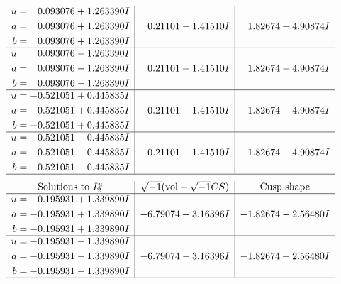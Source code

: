 \documentclass[1p]{elsarticle_modified}
\theoremstyle{definition}
\newcommand{\I}{\sqrt{-1}}
\begin{document}
$$\begin{array}{c|c|c}
\begin{aligned}
u &= \phantom{-}0.093076 + 1.263390 I \\
a &= \phantom{-}0.093076 + 1.263390 I \\
b &= \phantom{-}0.093076 + 1.263390 I\end{aligned}
 & \phantom{-}0.21101 - 1.41510 I & \phantom{-}1.82674 + 4.90874 I \\ \hline\begin{aligned}
u &= \phantom{-}0.093076 - 1.263390 I \\
a &= \phantom{-}0.093076 - 1.263390 I \\
b &= \phantom{-}0.093076 - 1.263390 I\end{aligned}
 & \phantom{-}0.21101 + 1.41510 I & \phantom{-}1.82674 - 4.90874 I \\ \hline\begin{aligned}
u &= -0.521051 + 0.445835 I \\
a &= -0.521051 + 0.445835 I \\
b &= -0.521051 + 0.445835 I\end{aligned}
 & \phantom{-}0.21101 + 1.41510 I & \phantom{-}1.82674 - 4.90874 I \\ \hline\begin{aligned}
u &= -0.521051 - 0.445835 I \\
a &= -0.521051 - 0.445835 I \\
b &= -0.521051 - 0.445835 I\end{aligned}
 & \phantom{-}0.21101 - 1.41510 I & \phantom{-}1.82674 + 4.90874 I\\
 \hline 
 \end{array}$$\newpage$$\begin{array}{c|c|c}  
\text{Solutions to }I^u_{2}& \I (\text{vol} + \sqrt{-1}CS) & \text{Cusp shape}\\
 \hline 
\begin{aligned}
u &= -0.195931 + 1.339890 I \\
a &= -0.195931 + 1.339890 I \\
b &= -0.195931 + 1.339890 I\end{aligned}
 & -6.79074 + 3.16396 I & -1.82674 - 2.56480 I \\ \hline\begin{aligned}
u &= -0.195931 - 1.339890 I \\
a &= -0.195931 - 1.339890 I \\
b &= -0.195931 - 1.339890 I\end{aligned}
 & -6.79074 - 3.16396 I & -1.82674 + 2.56480 I\\
 \hline 
 \end{array}$$\newpage\newpage\renewcommand{\arraystretch}{1}
\end{document}
